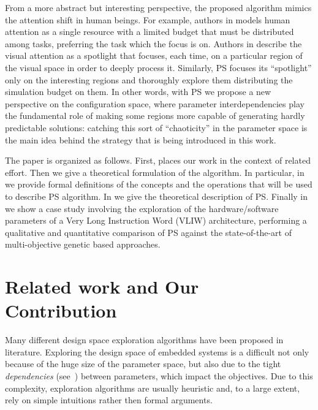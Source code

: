 From a more abstract but interesting perspective, the proposed
algorithm mimics the attention shift in human beings. For example,
authors in \cite{attention} models human attention as a single
resource with a limited budget that must be distributed among tasks,
preferring the task which the focus is on.  Authors in
\cite{spatial_attention} describe the visual attention as a spotlight
that focuses, each time, on a particular region of the visual space in
order to deeply process it. Similarly, PS focuses its
``spotlight'' only on the interesting regions and thoroughly explore them distributing the simulation budget on them.
In other words, with PS we propose a new perspective on the configuration space,
where parameter interdependencies play the fundamental role of making
some regions more capable of generating hardly predictable solutions:
catching this sort of ``chaoticity'' in the parameter space is the
main idea behind the strategy that is being introduced in this work.


The paper is organized as follows. First,  places our work in the context of related effort.
Then we give a theoretical formulation of the algorithm. In particular, in  we provide formal definitions of the concepts and the operations that will be used to describe PS algorithm. In  we give the theoretical description of PS. 
Finally in  we show a case
study involving the exploration of the hardware/software parameters of
a Very Long Instruction Word (VLIW) architecture, performing a
qualitative and quantitative comparison of PS against the state-of-the-art
of multi-objective genetic based approaches.


\section{Related work and Our Contribution}
Many different design space exploration algorithms have been proposed
in literature. Exploring the design space of embedded systems is a difficult not only because of the huge size of the parameter space, but also due to the tight \emph{dependencies} (see~) between parameters, which impact the objectives.
Due to this complexity, exploration algorithms are usually heuristic and, to a large extent, rely on simple intuitions rather then formal arguments.


